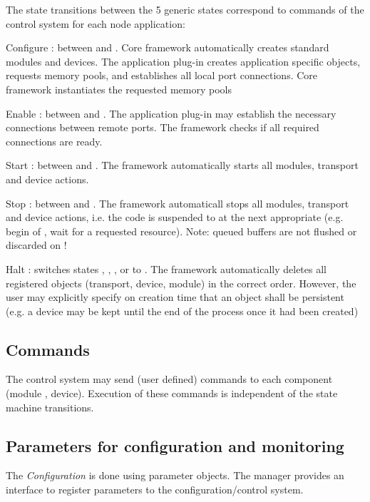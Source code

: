 The state transitions between the 5 generic states correspond to 
      commands of the control system for each node application:
\begin{compactdesc}
\item[Configure] : between  and . Core 
	 framework automatically creates standard modules and 
	 devices. The application plug-in  creates application 
	 specific objects, requests memory pools, and establishes all 
	 local port connections. Core framework instantiates the 
	 requested memory pools
\item[Enable] : between  and . 
	 The application plug-in may establish the necessary 
	 connections between remote ports. The framework checks if 
	 all required connections are ready.
\item[Start]  : between  and . The framework automatically 
	 starts all modules, transport and device actions.
\item[Stop] : between  and . The framework automaticall 
	 stops all modules, transport and device actions, 
	 i.e. the code is suspended to  at the next appropriate 
	  (e.g. begin of , wait for a requested resource). 
	 Note: queued buffers are not flushed or discarded on  !
\item[Halt] : switches states  ,  , , or 
	  to . The framework automatically deletes all 
	 registered objects (transport, device, module) 
	 in the correct order. However, the user may explicitly specify on 
	 creation time that an object shall be persistent (e.g. a device may 
	 be kept until the end of the process once it had been created) 
\end{compactdesc}


\subsection{Commands}
The control system may send (user defined) commands to each 
   component (module , device). Execution of these commands is 
   independent of the state machine transitions.

\subsection{Parameters for configuration and monitoring}
The {\sl Configuration} is done using parameter objects. The 
   manager provides an interface to register parameters to the
    configuration/control system.    

